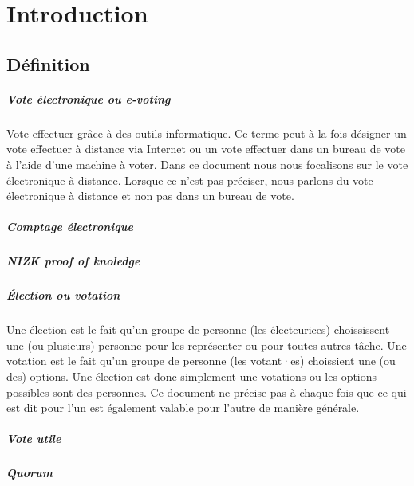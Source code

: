 \documentclass[../report]{subfiles}
\begin{document}
  \chapter{Introduction}

  \section{Définition}

  \paragraph{Vote électronique ou e-voting}
  Vote effectuer grâce à des outils informatique.
  Ce terme peut à la fois désigner un vote effectuer à distance via Internet ou un vote effectuer
  dans un bureau de vote à l'aide d'une machine à voter.
  Dans ce document nous nous focalisons sur le vote électronique à distance.
  Lorsque ce n'est pas préciser, nous parlons du vote électronique à distance et non pas dans un bureau de vote.

  \paragraph{Comptage électronique}
  \todo{}
  
  \paragraph{NIZK proof of knoledge}
  \todo{}

  \paragraph{Élection ou votation}
  Une élection est le fait qu'un groupe de personne (les électeurices) choississent une (ou plusieurs) personne
  pour les représenter ou pour toutes autres tâche.
  Une votation est le fait qu'un groupe de personne (les votant·es) choissient une (ou des) options.
  Une élection est donc simplement une votations ou les options possibles sont des personnes.
  Ce document ne précise pas à chaque fois que ce qui est dit pour l'un est également valable pour l'autre de 
  manière générale.

  \paragraph{Vote utile}
  \todo{}
  \paragraph{Quorum}
  \todo{}
\end{document}
